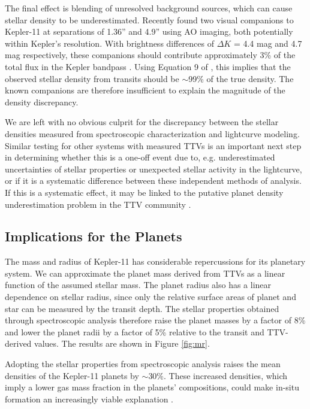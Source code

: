 \documentclass[oneside]{emulateapj}
\begin{document}
The final effect is blending of unresolved background sources, which can cause stellar density to be underestimated. Recently \citet{Wang2015} found two visual companions to Kepler-11 at separations of 1.36'' and 4.9'' using AO imaging, both potentially within Kepler's resolution. With brightness differences of $\Delta K$ = 4.4 mag and 4.7 mag respectively, these companions should contribute approximately 3\% of the total flux in the Kepler bandpass . Using Equation 9 of \citet{Kipping2014}, this implies that the observed stellar density from transits should be $\sim$99\% of the true density. The known companions are therefore insufficient to explain the magnitude of the density discrepancy.

We are left with no obvious culprit for the discrepancy between the stellar densities measured from spectroscopic characterization and lightcurve modeling. Similar testing for other systems with measured TTVs is an important next step in determining whether this is a one-off event due to, e.g. underestimated uncertainties of stellar properties or unexpected stellar activity in the lightcurve, or if it is a systematic difference between these independent methods of analysis. If this is a systematic effect, it may be linked to the putative planet density underestimation problem in the TTV community \citep{Weiss2014}.

\subsection{Implications for the Planets}

The mass and radius of Kepler-11 has considerable repercussions for its planetary system. We can approximate the planet mass derived from TTVs as a linear function of the assumed stellar mass. The planet radius also has a linear dependence on stellar radius, since only the relative surface areas of planet and star can be measured by the transit depth. The stellar properties obtained through spectroscopic analysis therefore raise the planet masses by a factor of 8\% and lower the planet radii by a factor of 5\% relative to the transit and TTV-derived values. The results are shown in Figure \ref{fig:mr}.

Adopting the stellar properties from spectroscopic analysis raises the mean densities of the Kepler-11 planets by $\sim$30\%. These increased densities, which imply a lower gas mass fraction in the planets' compositions, could make in-situ formation an increasingly viable explanation \citep[see e.g.][]{Lee2014}.
\end{document}
